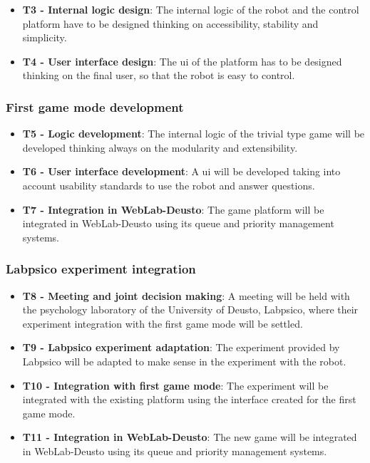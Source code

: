 \begin{itemize}
\item \textbf{T3 - Internal logic design}: The internal logic of the robot and the control platform
have to be designed thinking on accessibility, stability and simplicity.

\item \textbf{T4 - User interface design}: The \acrlong{ui} of the platform has to be designed
thinking on the final user, so that the robot is easy to control.
\end{itemize}

\subsubsection{First game mode development}

\begin{itemize}
\item \textbf{T5 - Logic development}: The internal logic of the trivial type game will be developed
thinking always on the modularity and extensibility.

\item \textbf{T6 - User interface development}: A \acrlong{ui} will be developed taking into account
usability standards to use the robot and answer questions.

\item \textbf{T7 - Integration in WebLab-Deusto}: The game platform will be integrated in
WebLab-Deusto using its queue and priority management systems.
\end{itemize}

\subsubsection{Labpsico experiment integration}

\begin{itemize}
\item \textbf{T8 - Meeting and joint decision making}: A meeting will be held with the psychology
laboratory of the University of Deusto, Labpsico, where their experiment integration with the first
game mode will be settled.

\item \textbf{T9 - Labpsico experiment adaptation}: The experiment provided by Labpsico will be
adapted to make sense in the experiment with the robot.

\item \textbf{T10 - Integration with first game mode}: The experiment will be integrated with the
existing platform using the interface created for the first game mode.

\item \textbf{T11 - Integration in WebLab-Deusto}: The new game will be integrated in WebLab-Deusto
using its queue and priority management systems.
\end{itemize}

